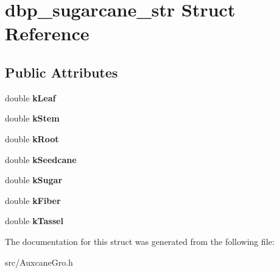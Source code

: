\hypertarget{structdbp__sugarcane__str}{\section{dbp\-\_\-sugarcane\-\_\-str Struct Reference}
\label{structdbp__sugarcane__str}
}
\subsection*{Public Attributes}
\begin{DoxyCompactItemize}
\item 
\hypertarget{structdbp__sugarcane__str_afa2109808dcdbb3fea5fc702278a9f2b}{double {\bfseries k\-Leaf}}\label{structdbp__sugarcane__str_afa2109808dcdbb3fea5fc702278a9f2b}

\item 
\hypertarget{structdbp__sugarcane__str_a322e4dfa9949125ef77b1b011c6e6fb2}{double {\bfseries k\-Stem}}\label{structdbp__sugarcane__str_a322e4dfa9949125ef77b1b011c6e6fb2}

\item 
\hypertarget{structdbp__sugarcane__str_ab3d2b48319fc8fd03c6234039d660a24}{double {\bfseries k\-Root}}\label{structdbp__sugarcane__str_ab3d2b48319fc8fd03c6234039d660a24}

\item 
\hypertarget{structdbp__sugarcane__str_a2736b8f3892fc2340b178f9ca5f35b71}{double {\bfseries k\-Seedcane}}\label{structdbp__sugarcane__str_a2736b8f3892fc2340b178f9ca5f35b71}

\item 
\hypertarget{structdbp__sugarcane__str_a97160f470e4c493ed2cc7a1222442ea6}{double {\bfseries k\-Sugar}}\label{structdbp__sugarcane__str_a97160f470e4c493ed2cc7a1222442ea6}

\item 
\hypertarget{structdbp__sugarcane__str_a8dc44bd4c1e866c75d5f53e61d9b72ec}{double {\bfseries k\-Fiber}}\label{structdbp__sugarcane__str_a8dc44bd4c1e866c75d5f53e61d9b72ec}

\item 
\hypertarget{structdbp__sugarcane__str_a5beab59c2ee2fccae0831cee119b2a7e}{double {\bfseries k\-Tassel}}\label{structdbp__sugarcane__str_a5beab59c2ee2fccae0831cee119b2a7e}

\end{DoxyCompactItemize}


The documentation for this struct was generated from the following file\-:\begin{DoxyCompactItemize}
\item 
src/Auxcane\-Gro.\-h\end{DoxyCompactItemize}
